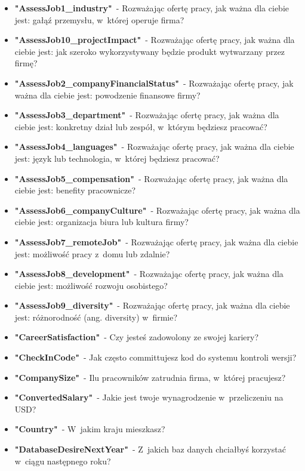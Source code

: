\begin{appendices}
\begin{itemize}
        \item \textbf{"AssessJob1\_industry"}~- Rozważając ofertę pracy, jak ważna dla ciebie jest: gałąź przemysłu, w~której operuje firma?
        \item \textbf{"AssessJob10\_projectImpact"}~- Rozważając ofertę pracy, jak ważna dla ciebie jest: jak szeroko wykorzystywany będzie produkt wytwarzany przez firmę?
        \item \textbf{"AssessJob2\_companyFinancialStatus"}~- Rozważając ofertę pracy, jak ważna dla ciebie jest: powodzenie finansowe firmy?
        \item \textbf{"AssessJob3\_department"}~- Rozważając ofertę pracy, jak ważna dla ciebie jest: konkretny dział lub zespół, w~którym będziesz pracować?
        \item \textbf{"AssessJob4\_languages"}~- Rozważając ofertę pracy, jak ważna dla ciebie jest: język lub technologia, w~której będziesz pracować?
        \item \textbf{"AssessJob5\_compensation"}~- Rozważając ofertę pracy, jak ważna dla ciebie jest: benefity pracownicze?
        \item \textbf{"AssessJob6\_companyCulture"}~- Rozważając ofertę pracy, jak ważna dla ciebie jest: organizacja biura lub kultura firmy?
        \item \textbf{"AssessJob7\_remoteJob"}~- Rozważając ofertę pracy, jak ważna dla ciebie jest: możliwość pracy z~domu lub zdalnie?
        \item \textbf{"AssessJob8\_development"}~- Rozważając ofertę pracy, jak ważna dla ciebie jest: możliwość rozwoju osobistego?
        \item \textbf{"AssessJob9\_diversity"}~- Rozważając ofertę pracy, jak ważna dla ciebie jest: różnorodność (ang. diversity) w~firmie?
        \item \textbf{"CareerSatisfaction"}~- Czy jesteś zadowolony ze swojej kariery?
        \item \textbf{"CheckInCode"}~- Jak często committujesz kod do systemu kontroli wersji?
        \item \textbf{"CompanySize"}~- Ilu pracowników zatrudnia firma, w~której pracujesz?
        \item \textbf{"ConvertedSalary"}~- Jakie jest twoje wynagrodzenie w~przeliczeniu na USD?
        \item \textbf{"Country"}~- W~jakim kraju mieszkasz?
        \item \textbf{"DatabaseDesireNextYear"}~- Z~jakich baz danych chciałbyś korzystać w~ciągu następnego roku?

\end{itemize}
\end{appendices}
